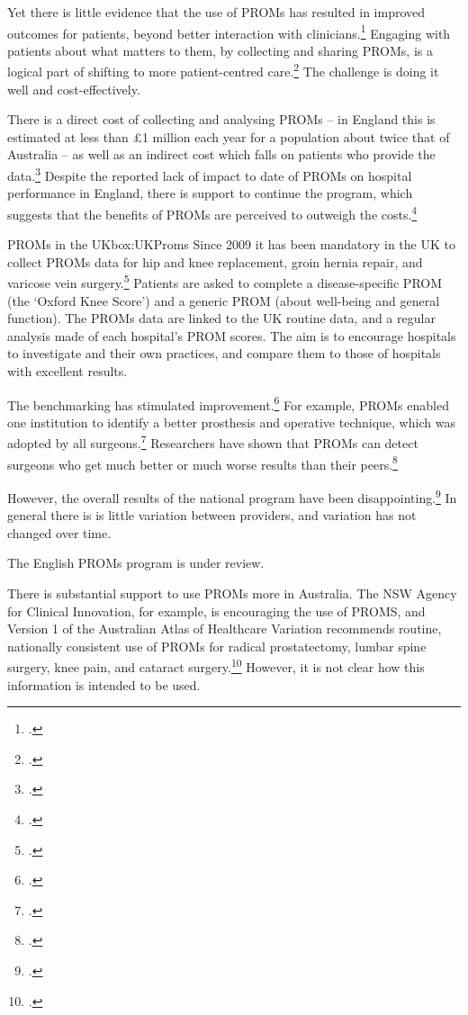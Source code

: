 \documentclass[FrontPage]{grattan}
\begin{document}
Yet there is little evidence that the use of PROMs has resulted in improved outcomes for patients, beyond better interaction with clinicians.\footcites{RN69}{RN70}{RN68}{RN64}
Engaging with patients about what matters to them, by collecting and sharing PROMs, is a logical part of shifting to more patient-centred care.\footcite{RN71}
The challenge is doing it well and cost-effectively.

There is a direct cost of collecting and analysing PROMs -- in England this is estimated at less than \pounds1 million each year for a population about twice that of Australia -- as well as an indirect cost which falls on patients who provide the data.\footcite{kyte2016reflections}
Despite the reported lack of impact to date of PROMs on hospital performance in England, there is support to continue the program, which suggests that the benefits of PROMs are perceived to outweigh the costs.\footcite{kyte2016reflections}

\begin{smallbox}{PROMs in the UK}{box:UKProms}
Since 2009 it has been mandatory in the UK to collect PROMs data for hip and knee replacement, groin hernia repair, and varicose vein surgery.\footcite{RN74}
Patients are asked to complete a disease-specific PROM (the ‘Oxford Knee Score’) and a generic PROM (about well-being and general function). The PROMs data are linked to the UK routine data, and a regular analysis made of each hospital’s PROM scores. The aim is to encourage hospitals to investigate and their own practices, and compare them to those of hospitals with excellent results. 

The benchmarking has stimulated improvement.\footcites{RN64}{basser2015patient}
For example, PROMs enabled one institution to identify a better prosthesis and operative technique, which was adopted by all surgeons.\footcite{partridge2016improving}
Researchers have shown that PROMs can detect surgeons who get much better or much worse results than their peers.\footcite{RN73} 

However, the overall results of the national program have been disappointing.\footcites{RN75}{RN74}
In general there is is little variation between providers, and variation has not changed over time. 

The English PROMs program is under review.
\end{smallbox}

There is substantial support to use PROMs more in Australia. The NSW Agency for Clinical Innovation, for example, is encouraging the use of PROMS, and Version 1 of the Australian Atlas of Healthcare Variation recommends routine, nationally consistent use of PROMs for radical prostatectomy, lumbar spine surgery, knee pain, and cataract surgery.\footcites{RN70}{sansoni2016health}
However, it is not clear how this information is intended to be used.
\end{document}
